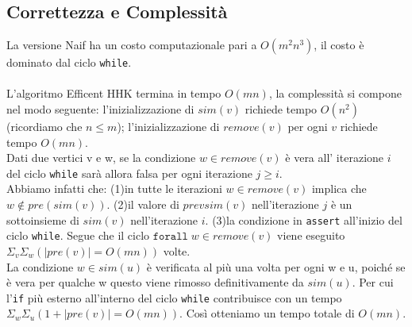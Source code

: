 \subsection{Correttezza e Complessità}
La versione Naif ha un costo computazionale pari a $O(m^2 n^3)$, il costo è dominato dal ciclo \texttt{while}.
\\\\
L'algoritmo Efficent HHK termina in tempo $O(mn)$, la complessità si compone nel modo seguente: l'inizializzazione di $sim(v)$ richiede tempo $O(n^2)$(ricordiamo che $n \leq m$); l'inizializzazione di $remove(v)$ per ogni $v$ richiede tempo $O(mn)$.\\
Dati due vertici v e w, se la condizione $w \in remove(v)$ è vera all' iterazione $i$ del ciclo \texttt{while} sarà allora falsa per ogni iterazione $j\geq i$.\\ Abbiamo infatti che:  
(1)in tutte le iterazioni $w \in remove(v)$ implica che $w\not\in pre(sim(v))$.
(2)il valore di $prevsim(v)$ nell'iterazione $j$ è un sottoinsieme di $sim(v)$ nell'iterazione $i$.
(3)la condizione in \texttt{assert} all'inizio del ciclo \texttt{while}.
Segue che il ciclo $\mathtt{for all}\;w \in remove(v)$ viene eseguito $\Sigma_v\Sigma_w(|pre(v)|=O(mn))$ volte.\\
La condizione $w \in sim(u)$ è verificata al più una volta per ogni w e u, poiché se è vera per qualche w questo viene rimosso definitivamente da $sim(u)$. Per cui l'\texttt{if} più esterno all'interno del ciclo \texttt{while} contribuisce con un tempo $\Sigma_w\Sigma_u(1+|pre(v)|=O(mn))$. Così otteniamo un tempo totale di $O(mn)$.\\
